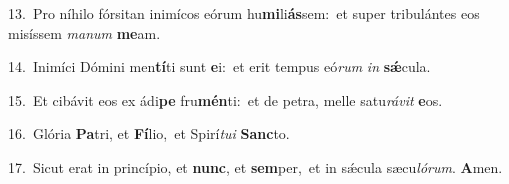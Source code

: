 {\numbfont\textcolor{\numbcolor}{13.}}~Pro níhilo fórsitan inimícos eórum hu\-\textbf{mi}\-li\-\textbf{ás}\-sem:~\star et super tribulántes eos misíssem \textit{ma}\-\textit{num} \textbf{me}\-am.\par
{\numbfont\textcolor{\numbcolor}{14.}}~Inimíci Dómini men\-\textbf{tí}\-ti sunt \textbf{e}\-i:~\star et erit tempus eó\textit{rum} \textit{in} \textbf{sǽ}\-cula.\par
{\numbfont\textcolor{\numbcolor}{15.}}~Et cibávit eos ex ádi\textbf{pe} fru\-\textbf{mén}\-ti:~\star et de petra, melle satu\-\textit{rá}\-\textit{vit} \textbf{e}\-os.\par
{\numbfont\textcolor{\numbcolor}{16.}}~Glória \textbf{Pa}\-tri, et \textbf{Fí}\-lio,~\star et Spirí\-\textit{tu}\-\textit{i} \textbf{Sanc}\-to.\par
{\numbfont\textcolor{\numbcolor}{17.}}~Sicut erat in princípio, et \textbf{nunc}\-, et \textbf{sem}\-per,~\star et in sǽcula sæcu\-\textit{ló}\-\textit{rum}. \textbf{A}\-men.\par
